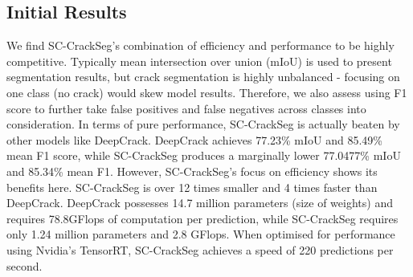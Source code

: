 \documentclass[a4paper,12pt]{report}
\begin{document}
\subsection{Initial Results}
We find SC-CrackSeg's combination of efficiency and performance to be highly competitive. Typically mean intersection over union (mIoU) is used to present segmentation results, but crack segmentation is highly unbalanced - focusing on one class (no crack) would skew model results. Therefore, we also assess using F1 score to further take false positives and false negatives across classes into consideration. In terms of pure performance, SC-CrackSeg is actually beaten by other models like DeepCrack. DeepCrack achieves 77.23\% mIoU and 85.49\% mean F1 score, while SC-CrackSeg produces a marginally lower 77.0477\% mIoU and 85.34\% mean F1. However, SC-CrackSeg's focus on efficiency shows its benefits here. SC-CrackSeg is over 12 times smaller and 4 times faster than DeepCrack. DeepCrack possesses 14.7 million parameters (size of weights) and requires 78.8GFlops of computation per prediction, while SC-CrackSeg requires only 1.24 million parameters and 2.8 GFlops. When optimised for performance using Nvidia's TensorRT, SC-CrackSeg achieves a speed of 220 predictions per second.
\end{document}
